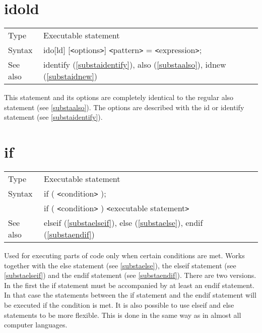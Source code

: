 
\section{idold}
\label{substaidold}

\noindent \begin{tabular}{ll}
Type & Executable statement\\
Syntax & ido[ld] [{\tt<}options{\tt>}] {\tt<}pattern{\tt>} = {\tt<}expression{\tt>};
\\ See also & identify (\ref{substaidentify}),
              also (\ref{substaalso}),
              idnew (\ref{substaidnew})
\end{tabular}\vspace{4mm}

\noindent This statement and its options are completely 
identical to the regular also statement (see \ref{substaalso}). 
The options are described with the id or identify 
statement (see \ref{substaidentify}).
\vspace{10mm}

 
\section{if}
\label{substaif}

\noindent \begin{tabular}{ll}
Type & Executable statement\\
Syntax & if ( {\tt<}condition{\tt>} ); \\
       & if ( {\tt<}condition{\tt>} ) {\tt<}executable statement{\tt>}
\\ See also & elseif (\ref{substaelseif}),
              else (\ref{substaelse}),
              endif (\ref{substaendif})
\end{tabular} \vspace{4mm}

\noindent Used for executing parts of code only when certain 
conditions are met. Works together with the 
else statement (see \ref{substaelse}), the elseif 
statement (see \ref{substaelseif}) and the endif statement 
(see \ref{substaendif}). There are two versions. In the first the if 
statement must be accompanied by at least an endif statement. In that case 
the statements between the if statement and the endif statement will be 
executed if the condition is met. It is also possible to use elseif and 
else statements to be more flexible. This is done in the same way as in 
almost all computer languages.

